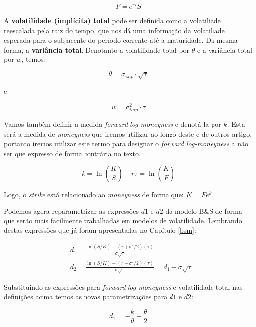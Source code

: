 \documentclass[]{book}
\theoremstyle{definition}
\theoremstyle{definition}
\theoremstyle{definition}
\theoremstyle{remark}
\begin{document}
\begin{equation}
F=e^{r\tau}S
\end{equation}

A \textbf{volatilidade (implícita) total} pode ser definida como a
volatiliade reescalada pela raiz do tempo, que nos dá uma informação da
volatiliade esperada para o subjacente do período corrente até a
maturidade. Da mesma forma, a \textbf{variância total}. Denotanto a
volatilidade total por \(\theta\) e a variância total por \(w\), temos:

\begin{equation}
\theta=\sigma_{imp}\cdot \sqrt{\tau} 
\label{eq:voltotal}
\end{equation}

e

\begin{equation}
w=\sigma_{imp}^2\cdot\tau
\label{eq:vartotal}
\end{equation}

Vamos também definir a medida \emph{forward log-moneyness} e denotá-la
por \(k\). Esta será a medida de \emph{moneyness} que iremos utilizar ao
longo deste e de outros artigo, portanto iremos utilizar este termo para
designar o \emph{forward log-moneyness} a não ser que expresso de forma
contrária no texto.

\begin{equation}
k=\ln\left(\frac{K}{S}\right)-r\tau=\ln\left(\frac{K}{F}\right)
\label{eq:flmoneyness}
\end{equation}

Logo, o \emph{strike} está relacionado ao \emph{moneyness} de forma que:
\(K=Fe^k\).

Podemos agora reparametrizar as expressões \(d1\) e \(d2\) do modelo
B\&S de forma que serão mais facilmente trabalhadas em modelos de
volatilidade. Lembrando destas expressões que já foram apresentadas no
Capítulo \ref{bsm}:

\begin{align}
&d_{1}={\frac {\ln(S/K)+(r+\sigma ^{2}/2)(\tau)}{\sigma {\sqrt {\tau}}}}\\
&d_{2}={\frac {\ln(S/K)+(r-\sigma ^{2}/2)(\tau)}{\sigma {\sqrt {\tau}}}}=d_1-\sigma\sqrt{\tau}
\end{align}

Substituindo as expressões para \emph{forward log-moneyness} e
volatilidade total nas definições acima temos as novas parametrizações
para \(d1\) e \(d2\):

\begin{equation}
d_{1}={-\frac{k}{\theta}+\frac{\theta}{2}}
\label{eq:d1mod}
\end{equation}
\end{document}
